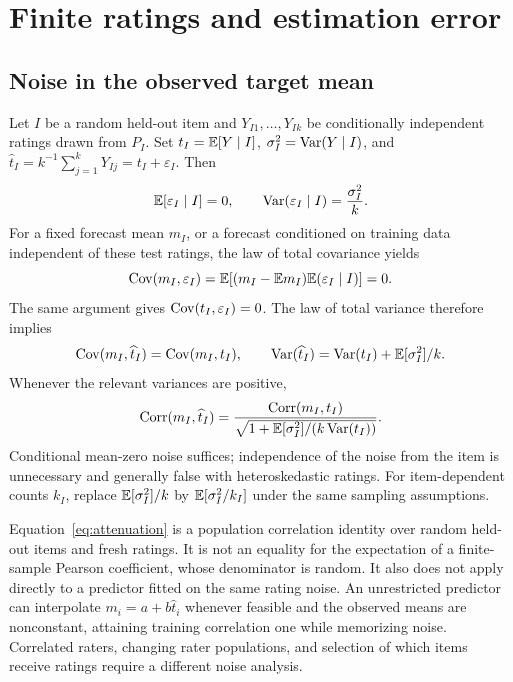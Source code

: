 \section{Finite ratings and estimation error}
\subsection{Noise in the observed target mean}
Let $I$ be a random held-out item and $Y_{I1},\ldots,Y_{Ik}$ be conditionally independent ratings drawn from $P_I$.
Set $t_I=\mathbb{E}[Y\mid I]$, $\sigma_I^2=\operatorname{Var}(Y\mid I)$, and $\widehat t_I=k^{-1}\sum_{j=1}^kY_{Ij}=t_I+\varepsilon_I$.
Then
\[
 \mathbb{E}[\varepsilon_I\mid I]=0,\qquad \operatorname{Var}(\varepsilon_I\mid I)=\frac{\sigma_I^2}{k}.
\]
For a fixed forecast mean $m_I$, or a forecast conditioned on training data independent of these test ratings, the law of total covariance yields
\[
 \operatorname{Cov}(m_I,\varepsilon_I)=\mathbb{E}[(m_I-\mathbb{E} m_I)\mathbb{E}(\varepsilon_I\mid I)]=0.
\]
The same argument gives $\operatorname{Cov}(t_I,\varepsilon_I)=0$.
The law of total variance therefore implies
\[
 \operatorname{Cov}(m_I,\widehat t_I)=\operatorname{Cov}(m_I,t_I),\qquad
 \operatorname{Var}(\widehat t_I)=\operatorname{Var}(t_I)+\mathbb{E}[\sigma_I^2]/k.
\]
Whenever the relevant variances are positive,
\begin{equation}\label{eq:attenuation}
 \operatorname{Corr}(m_I,\widehat t_I)
 =\frac{\operatorname{Corr}(m_I,t_I)}{\sqrt{1+\mathbb{E}[\sigma_I^2]/(k\operatorname{Var}(t_I))}}.
\end{equation}
Conditional mean-zero noise suffices; independence of the noise from the item is unnecessary and generally false with heteroskedastic ratings.
For item-dependent counts $k_I$, replace $\mathbb{E}[\sigma_I^2]/k$ by $\mathbb{E}[\sigma_I^2/k_I]$ under the same sampling assumptions.

Equation~\eqref{eq:attenuation} is a population correlation identity over random held-out items and fresh ratings.
It is not an equality for the expectation of a finite-sample Pearson coefficient, whose denominator is random.
It also does not apply directly to a predictor fitted on the same rating noise.
An unrestricted predictor can interpolate $m_i=a+b\widehat t_i$ whenever feasible and the observed means are nonconstant, attaining training correlation one while memorizing noise.
Correlated raters, changing rater populations, and selection of which items receive ratings require a different noise analysis.

